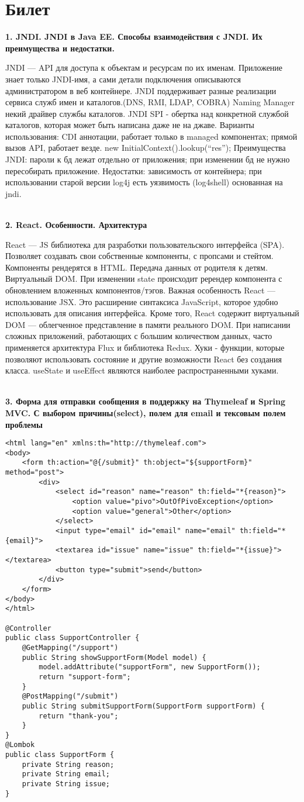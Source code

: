 \documentclass{article}
\newcommand{\bil}[5]{%
        \section{Билет}
        \textbf{1. #1}

        #4
        \\
        \textbf{2. #2}
        
        #5
        \\
        \textbf{3. #3}
}
\begin{document}
\bil{JNDI. JNDI в Java EE. Способы взаимодействия с JNDI. Их преимущества и недостатки.}{React. Особенности. Архитектура}
{Форма для отправки сообщения в поддержку на Thymeleaf и Spring MVC. С выбором причины(select), полем для email и тексовым полем проблемы}{
    JNDI — API для доступа к объектам и ресурсам по их именам.
    Приложение знает только JNDI-имя, а сами детали подключения описываются администратором в веб контейнере. 
    JNDI поддерживает разные реализации сервиса служб имен и каталогов.(DNS, RMI, LDAP, COBRA)
    Naming Manager некий драйвер службы каталогов. JNDI SPI - обертка над конкретной службой каталогов, которая может быть написана даже не на джаве.
    Варианты использования: CDI аннотации, работает только в managed компонентах; прямой вызов API, работает везде. new InitialContext().lookup(“res”);
    Преимущества JNDI: пароли к бд лежат отдельно от приложения; при изменении бд не нужно пересобирать приложение. Недостатки: зависимость от контейнера; при использовании старой версии log4j есть уязвимость (log4shell) основанная на jndi.
}{
    React — JS библиотека для разработки пользовательского интерфейса (SPA).
    Позволяет создавать свои собственные компоненты, с пропсами и стейтом. 
    Компоненты рендерятся в HTML. Передача данных от родителя к детям. 
    Виртуальный DOM. При изменении state происходит ререндер компонента с обновлением вложенных компонентов/тэгов. 
    Важная особенность React — использование JSX. Это расширение синтаксиса JavaScript, которое удобно использовать для описания интерфейса. 
    Кроме того, React содержит виртуальный DOM — облегченное представление в памяти реального DOM. 
    При написании сложных приложений, работающих с большим количеством данных, часто применяется архитектура Flux и библиотека Redux.
    Хуки - функции, которые позволяют использовать состояние и другие возможности React без создания класса. useState и useEffect являются наиболее распространенными хуками.
}
\begin{lstlisting}[frame=single, basicstyle=\ttfamily, breaklines=true, breakatwhitespace=true, postbreak=\mbox{\textcolor{red}{$\hookrightarrow$}\space}]
<html lang="en" xmlns:th="http://thymeleaf.com">
<body>        
    <form th:action="@{/submit}" th:object="${supportForm}" method="post">
        <div>
            <select id="reason" name="reason" th:field="*{reason}">
                <option value="pivo">OutOfPivoException</option>
                <option value="general">Other</option>
            </select>
            <input type="email" id="email" name="email" th:field="*{email}">
            <textarea id="issue" name="issue" th:field="*{issue}"></textarea>
            <button type="submit">send</button>
        </div>
    </form>
</body>
</html>

@Controller
public class SupportController {
    @GetMapping("/support")
    public String showSupportForm(Model model) {
        model.addAttribute("supportForm", new SupportForm());
        return "support-form";
    }
    @PostMapping("/submit")
    public String submitSupportForm(SupportForm supportForm) {
        return "thank-you";
    }
}
@Lombok
public class SupportForm {
    private String reason;
    private String email;
    private String issue;
}
\end{lstlisting}
\end{document}

